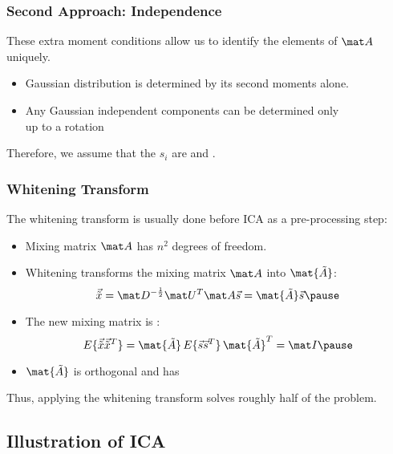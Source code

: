 \begin{frame}
  \frametitle{Second Approach: Independence}

  These extra moment conditions allow us to identify the elements of $\mat A$ uniquely. \\[.5cm]

  
  \begin{itemize}
    \item Gaussian distribution is determined by its second moments alone.
    \item Any Gaussian independent components can be determined only \\
      up to a rotation
  \end{itemize}
  \spread

  Therefore, we assume that the $s_i$ are  and .
\end{frame}


\begin{frame}
  \frametitle{Whitening Transform}

  The whitening transform is usually done before ICA as a pre-processing step: \pause

  \begin{itemize}
    \item Mixing matrix $\mat A$ has $n^2$ degrees of freedom. \pause
    \item Whitening transforms the mixing matrix $\mat A$ into $\mat{\tilde A}$:
      \begin{displaymath}
        \vec{\tilde x} = \mat D^{-\frac{1}{2}} \mat U^T \mat A \vec s = \mat{\tilde{A}} \vec s \pause
      \end{displaymath}      
    \item The new mixing matrix is :
      \begin{displaymath}
        E\{ \vec{\tilde x} \vec{\tilde x}^T \} = \mat{\tilde A} \, E\{\vec s \vec s^T \} \, \mat{\tilde A}^T = \mat I \pause
      \end{displaymath}      
    \item $\mat{\tilde A}$ is orthogonal and has 
  \end{itemize}

  Thus, applying the whitening transform solves roughly half of the problem.
\end{frame}


\subsection{Illustration of ICA}

